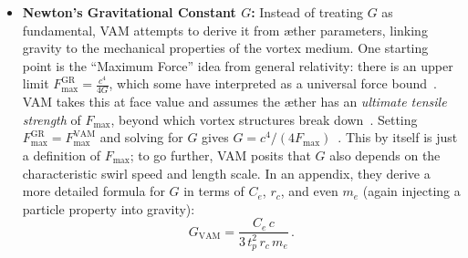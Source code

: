 \documentclass[a4paper,12pt]{article}
\begin{document}
\begin{itemize}
\item 
\textbf{Newton's Gravitational Constant $G$:} Instead of treating $G$ as fundamental, VAM attempts to derive it from æther parameters, linking gravity to the mechanical properties of the vortex medium. One starting point is the ``Maximum Force'' idea from general relativity: there is an upper limit $F_{\text{max}}^{\text{GR}} = \frac{c^4}{4G}$, which some have interpreted as a universal force bound~\cite{maxforce}. VAM takes this at face value and assumes the æther has an \textit{ultimate tensile strength} of $F_{\max}$, beyond which vortex structures break down~\cite{vamcore}. Setting $F_{\max}^{\text{GR}} = F_{\max}^{\text{VAM}}$ and solving for $G$ gives $G = c^4/(4F_{\max})$~\cite{vamcore}. This by itself is just a definition of $F_{\max}$; to go further, VAM posits that $G$ also depends on the characteristic swirl speed and length scale. In an appendix, they derive a more detailed formula for $G$ in terms of $C_e$, $r_c$, and even $m_e$ (again injecting a particle property into gravity):
\begin{equation}
    G_{\text{VAM}} = \frac{C_e\,c}{3\,t_p^2\, r_c\, m_e}\,.
    \label{eq:GVAM}
\end{equation}

\end{itemize}
\end{document}
